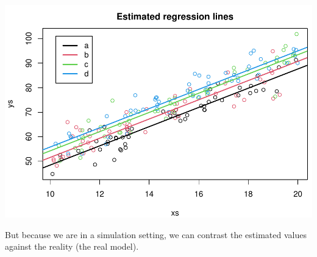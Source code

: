 \documentclass[
]{book}
\begin{document}
\includegraphics{ECOMODbook_files/figure-latex/a9.7-1.pdf}

But because we are in a simulation setting, we can contrast the estimated values against the reality (the real model).
\end{document}
